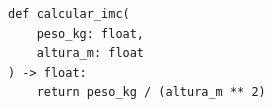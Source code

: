 \ifmostrarGabarito
\begin{verbatim}
def calcular_imc(
    peso_kg: float,
    altura_m: float
) -> float:
    return peso_kg / (altura_m ** 2)
\end{verbatim}

\fi
